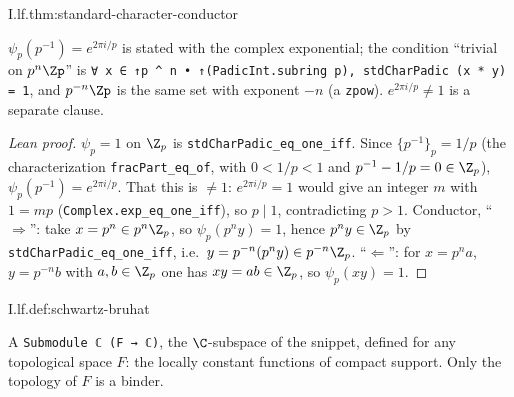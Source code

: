 \begin{theorem}
\end{theorem}
\begin{tfformal}{I.lf.thm:standard-character-conductor}
\begin{tffidelity}
$\psi_p(p^{-1})=e^{2\pi i/p}$ is stated with the complex exponential; the condition ``trivial on $p^n\Zp$'' is \texttt{∀ x ∈ ↑p \^{} n • ↑(PadicInt.subring p), stdCharPadic (x * y) = 1}, and $p^{-n}\Zp$ is the same set with exponent $-n$ (a \texttt{zpow}). $e^{2\pi i/p}\ne1$ is a separate clause.
\end{tffidelity}
\end{tfformal}
\begin{proof}[Lean proof]
$\psi_p=1$ on $\Z_p$ is \texttt{stdCharPadic\_eq\_one\_iff}. Since $\{p^{-1}\}_p=1/p$ (the characterization \texttt{fracPart\_eq\_of}, with $0<1/p<1$ and $p^{-1}-1/p=0\in\Z_p$), $\psi_p(p^{-1})=e^{2\pi i/p}$. That this is $\ne1$: $e^{2\pi i/p}=1$ would give an integer $m$ with $1=mp$ (\texttt{Complex.exp\_eq\_one\_iff}), so $p\mid1$, contradicting $p>1$. Conductor, ``$\Rightarrow$'': take $x=p^n\in p^n\Z_p$, so $\psi_p(p^ny)=1$, hence $p^ny\in\Z_p$ by \texttt{stdCharPadic\_eq\_one\_iff}, i.e.\ $y=p^{-n}(p^ny)\in p^{-n}\Z_p$. ``$\Leftarrow$'': for $x=p^na$, $y=p^{-n}b$ with $a,b\in\Z_p$ one has $xy=ab\in\Z_p$, so $\psi_p(xy)=1$.
\end{proof}

\begin{definition}
\end{definition}
\begin{tfformal}{I.lf.def:schwartz-bruhat}
\begin{tffidelity}
A \texttt{Submodule ℂ (F → ℂ)}, the $\C$-subspace of the snippet, defined for any topological space $F$: the locally constant functions of compact support. Only the topology of $F$ is a binder.
\end{tffidelity}
\end{tfformal}

